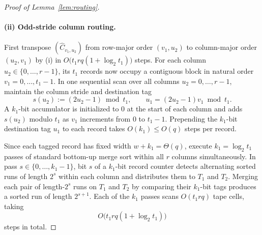 \begin{proof}[Proof of Lemma~\ref{lem:routing}]
\paragraph{(ii) Odd-stride column routing.}
First transpose $(\widehat{C}_{v_1, u_2})$ from row-major order $(v_1, u_2)$ to column-major order $(u_2, v_1)$ by (i) in $O\bigl(t_1 r q (1 + \log_2 t_1)\bigr)$ steps. For each column $u_2 \in \{0, \dots, r-1\}$, its $t_1$ records now occupy a contiguous block in natural order $v_1 = 0, \dots, t_1 - 1$. In one sequential scan over all columns $u_2 = 0, \dots, r-1$, maintain the column stride and destination tag
\[
  s(u_2) := (2u_2 - 1) \bmod t_1, \qquad u_1 = (2u_2 - 1) v_1 \bmod t_1.
\]
A $k_1$-bit accumulator is initialized to $0$ at the start of each column and adds $s(u_2)$ modulo $t_1$ as $v_1$ increments from $0$ to $t_1 - 1$. Prepending the $k_1$-bit destination tag $u_1$ to each record takes $O(k_1) \le O(q)$ steps per record.

Since each tagged record has fixed width $w + k_1 = \Theta(q)$, execute $k_1 = \log_2 t_1$ passes of standard bottom-up merge sort within all $r$ columns simultaneously. In pass $s \in \{0, \dots, k_1 - 1\}$, bit $s$ of a $k_1$-bit record counter detects alternating sorted runs of length $2^s$ within each column and distributes them to $T_1$ and $T_2$. Merging each pair of length-$2^s$ runs on $T_1$ and $T_2$ by comparing their $k_1$-bit tags produces a sorted run of length $2^{s+1}$. Each of the $k_1$ passes scans $O(t_1 r q)$ tape cells, taking
\[
  O\bigl(t_1 r q (1 + \log_2 t_1)\bigr)
\]
steps in total.
\end{proof}
